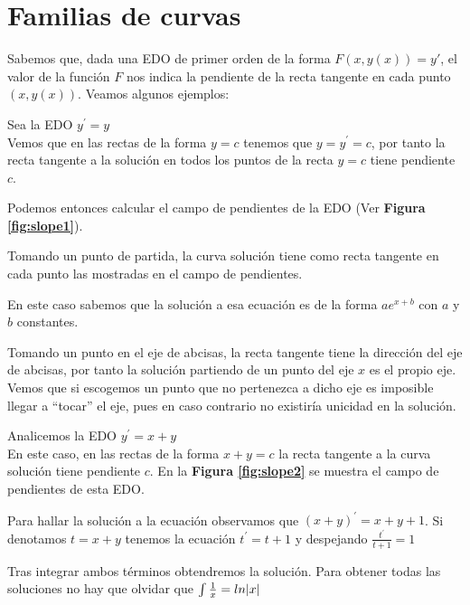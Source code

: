 \section{Familias de curvas}

Sabemos que, dada una EDO de primer orden de la forma $F(x,y(x)) = y'$, el valor de la función $F$ nos indica la pendiente de la recta tangente en cada punto $(x, y(x))$.
Veamos algunos ejemplos:


\begin{example}
Sea la EDO $y^\prime = y$\\
Vemos que en las rectas de la forma $y=c$ tenemos que $y=y^\prime = c$, por tanto la recta tangente a la solución en todos los puntos de la recta $y=c$ tiene pendiente $c$.

Podemos entonces calcular el campo de pendientes de la EDO (Ver \textbf{Figura \ref{fig:slope1}}).

Tomando un punto de partida, la curva solución tiene como recta tangente en cada punto las mostradas en el campo de pendientes.

En este caso sabemos que la solución a esa ecuación es de la forma $ae^{x+b}$ con $a$ y $b$ constantes.

Tomando un punto en el eje de abcisas, la recta tangente tiene la dirección del eje de abcisas, por tanto la solución partiendo de un punto del eje $x$ es el propio eje. Vemos que si escogemos un punto que no pertenezca a dicho eje es imposible llegar a ``tocar'' el eje, pues en caso contrario no existiría unicidad en la solución.
\end{example}


\begin{example}
Analicemos la EDO $y^\prime = x+y$\\
En este caso, en las rectas de la forma $x+y=c$ la recta tangente a la curva solución tiene pendiente $c$.
En la \textbf{Figura \ref{fig:slope2}} se muestra el campo de pendientes de esta EDO.

Para hallar la solución a la ecuación observamos que $(x+y)^\prime = x+y+1$. Si denotamos $t=x+y$ tenemos la ecuación $t^\prime=t+1$ y despejando $\frac{t^\prime}{t+1} = 1$

Tras integrar ambos términos obtendremos la solución.
Para obtener todas las soluciones no hay que olvidar que $\int \frac{1}{x} = ln|x|$
\end{example}

